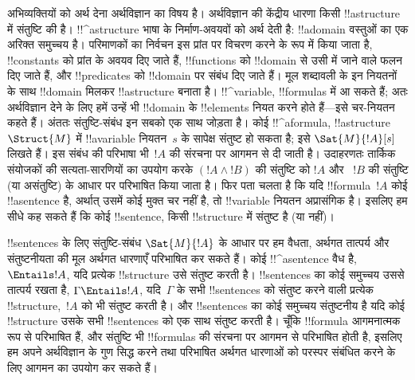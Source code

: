 \documentclass[../../../include/open-logic-section]{subfiles}
\begin{document}


अभिव्यक्तियों को अर्थ देना अर्थविज्ञान का विषय है। अर्थविज्ञान की केंद्रीय
धारणा किसी !!a{structure} में संतुष्टि की है। !!^a{structure} भाषा के
निर्माण-अवयवों को अर्थ देती है: !!a{domain} वस्तुओं का एक अरिक्त समुच्चय
है। परिमाणकों का निर्वचन इस प्रांत पर विचरण करने के रूप में किया जाता है,
!!{constant}s को प्रांत के अवयव दिए जाते हैं, !!{function}s को !!{domain}
से उसी में जाने वाले फलन दिए जाते हैं, और !!{predicate}s को !!{domain} पर
संबंध दिए जाते हैं। मूल शब्दावली के इन नियतनों के साथ !!{domain} मिलकर
!!a{structure} बनाता है। !!^{variable}, !!{formula}s में आ सकते हैं; अतः
अर्थविज्ञान देने के लिए हमें उन्हें भी !!{domain} के !!{element}s नियत करने
होते हैं---इसे चर-नियतन कहते हैं। अंततः संतुष्टि-संबंध इन सबको एक साथ जोड़ता
है। कोई !!^a{formula}, !!a{structure}~$\Struct{M}$ में
!!a{variable} नियतन~$s$ के सापेक्ष संतुष्ट हो सकता है; इसे
$\Sat{M}{!A}[s]$ लिखते हैं। इस संबंध की परिभाषा भी~$!A$ की संरचना पर आगमन
से दी जाती है। उदाहरणतः तार्किक संयोजकों की सत्यता-सारणियों का उपयोग करके
$(!A \land !B)$ की संतुष्टि को $!A$ और ~$!B$ की संतुष्टि (या असंतुष्टि) के
आधार पर परिभाषित किया जाता है। फिर पता चलता है कि यदि !!{formula}~$!A$ कोई
!!a{sentence} है, अर्थात् उसमें कोई मुक्त चर नहीं है, तो !!{variable}
नियतन अप्रासंगिक है। इसलिए हम सीधे कह सकते हैं कि कोई !!{sentence}, किसी
!!{structure} में संतुष्ट है (या नहीं)।

!!{sentence}s के लिए संतुष्टि-संबंध $\Sat{M}{!A}$ के आधार पर हम वैधता,
अर्थगत तात्पर्य और संतुष्टनीयता की मूल अर्थगत धारणाएँ परिभाषित कर सकते हैं।
कोई !!^a{sentence} वैध है, $\Entails !A$, यदि प्रत्येक !!{structure} उसे
संतुष्ट करती है। !!{sentence}s का कोई समुच्चय उससे तात्पर्य रखता है,
$\Gamma \Entails !A$, यदि~$\Gamma$ के सभी !!{sentence}s को संतुष्ट करने
वाली प्रत्येक !!{structure},~$!A$ को भी संतुष्ट करती है। और !!{sentence}s
का कोई समुच्चय संतुष्टनीय है यदि कोई !!{structure} उसके सभी !!{sentence}s
को एक साथ संतुष्ट करती है। चूँकि !!{formula} आगमनात्मक रूप से परिभाषित हैं,
और संतुष्टि भी !!{formula}s की संरचना पर आगमन से परिभाषित होती है, इसलिए हम
अपने अर्थविज्ञान के गुण सिद्ध करने तथा परिभाषित अर्थगत धारणाओं को परस्पर
संबंधित करने के लिए आगमन का उपयोग कर सकते हैं।
\end{document}
